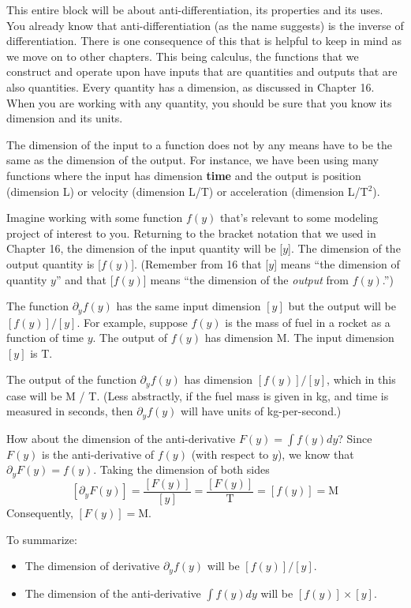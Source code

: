 \documentclass[
  letterpaper,
  DIV=11,
  numbers=noendperiod,
  oneside]{scrreprt}
\providecommand{\tightlist}{%
  \setlength{\itemsep}{0pt}\setlength{\parskip}{0pt}}
\begin{document}
This entire block will be about anti-differentiation, its properties and
its uses. You already know that anti-differentiation (as the name
suggests) is the inverse of differentiation. There is one consequence of
this that is helpful to keep in mind as we move on to other chapters.
This being calculus, the functions that we construct and operate upon
have inputs that are quantities and outputs that are also quantities.
Every quantity has a dimension, as discussed in Chapter 16. When you are
working with any quantity, you should be sure that you know its
dimension and its units.

The dimension of the input to a function does not by any means have to
be the same as the dimension of the output. For instance, we have been
using many functions where the input has dimension \textbf{time} and the
output is position (dimension L) or velocity (dimension L/T) or
acceleration (dimension L/T\(^2\)).

Imagine working with some function \(f(y)\) that's relevant to some
modeling project of interest to you. Returning to the bracket notation
that we used in Chapter 16, the dimension of the input quantity will be
{[}\(y\){]}. The dimension of the output quantity is {[}\(f(y)\){]}.
(Remember from 16 that {[}\(y\){]} means ``the dimension of quantity
\(y\)'' and that {[}\(f(y)\){]} means ``the dimension of the
\emph{output} from \(f(y)\).'')

The function \(\partial_y f(y)\) has the same input dimension \([y]\)
but the output will be \([f(y)] / [y]\). For example, suppose \(f(y)\)
is the mass of fuel in a rocket as a function of time \(y\). The output
of \(f(y)\) has dimension M. The input dimension \([y]\) is T.

The output of the function \(\partial_y f(y)\) has dimension
\([f(y)] / [y]\), which in this case will be M / T. (Less abstractly, if
the fuel mass is given in kg, and time is measured in seconds, then
\(\partial_y f(y)\) will have units of kg-per-second.)

How about the dimension of the anti-derivative \(F(y) = \int f(y) dy\)?
Since \(F(y)\) is the anti-derivative of \(f(y)\) (with respect to
\(y\)), we know that \(\partial_y F(y) = f(y)\). Taking the dimension of
both sides
\[[\partial_y F(y)] = \frac{[F(y)]}{[y]} = \frac{[F(y)]}{\text{T}} = [f(y)] = \text{M}\]
Consequently, \([F(y)] = \text{M}\).

To summarize:

\begin{itemize}
\tightlist
\item
  The dimension of derivative \(\partial_y f(y)\) will be
  \([f(y)] / [y]\).
\item
  The dimension of the anti-derivative \(\int f(y) dy\) will be
  \([f(y)]\times [y]\).
\end{itemize}
\end{document}
